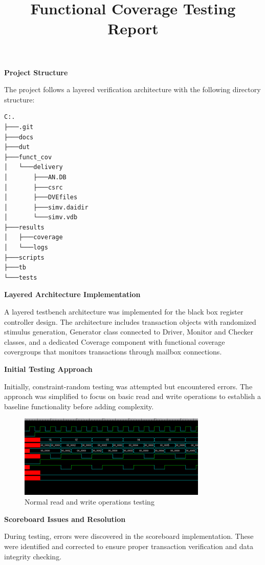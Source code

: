 \documentclass[11pt]{article}
\title{Functional Coverage Testing Report}
\author{}
\date{}
\begin{document}
\maketitle

\textbf{Project Structure}

The project follows a layered verification architecture with the following directory structure:

\begin{verbatim}
C:.
├───.git
├───docs
├───dut
├───funct_cov
│   └───delivery
│       ├───AN.DB
│       ├───csrc
│       ├───DVEfiles
│       ├───simv.daidir
│       └───simv.vdb
├───results
│   ├───coverage
│   └───logs
├───scripts
├───tb
└───tests
\end{verbatim}

\textbf{Layered Architecture Implementation}

A layered testbench architecture was implemented for the black box register controller design. The architecture includes transaction objects with randomized stimulus generation, Generator class connected to Driver, Monitor and Checker classes, and a dedicated Coverage component with functional coverage covergroups that monitors transactions through mailbox connections.

\textbf{Initial Testing Approach}

Initially, constraint-random testing was attempted but encountered errors. The approach was simplified to focus on basic read and write operations to establish a baseline functionality before adding complexity.

\begin{figure}[h]
\centering
\includegraphics[width=0.8\textwidth]{normal_read_write.png}
\caption{Normal read and write operations testing}
\end{figure}

\textbf{Scoreboard Issues and Resolution}

During testing, errors were discovered in the scoreboard implementation. These were identified and corrected to ensure proper transaction verification and data integrity checking.
\end{document}
